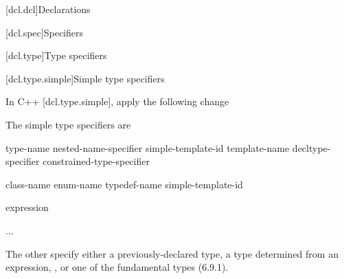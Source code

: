 
[dcl.dcl]{Declarations}

[dcl.spec]{Specifiers}

\setcounter{subsection}{6}
[dcl.type]{Type specifiers}

\setcounter{subsubsection}{1}
[dcl.type.simple]{Simple type specifiers}

In C++ [dcl.type.simple], apply the following change

\begin{std.txt}
The simple type specifiers are

\begin{bnf}
\br
     type-name\br
    nested-name-specifier  simple-template-id\br
     template-name\br
    \br
    \br
    \br
    \br
    \br
    \br
    \br
    \br
    \br
    \br
    \br
    \br
    \br
    \br
    decltype-specifier\br
    constrained-type-specifier\br
\end{bnf}

\begin{bnf}
\br
    class-name\br
    enum-name\br
    typedef-name\br
    simple-template-id
\end{bnf}

\begin{bnf}
\br
   \terminal{(} expression \terminal{)}\br
   \terminal{(}  \terminal{)}
\end{bnf}

\begin{bnf}
\br
\end{bnf}

\begin{bnf}
\br
  \added{\terminal{::}}\br
  \br
  \br
  \br
  \br
  \br
  \br
\end{bnf}

...

The other  specify either a
previously-declared type, a type determined from an expression, , or one of the fundamental types (6.9.1).
\end{std.txt}

